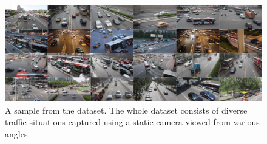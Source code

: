 \begin{figure}[t]
    \centerline{\includegraphics[width=\linewidth]{figures/datasets/uadetrac_samples.jpg}}
    \caption[\uadetrac{} dataset]{A sample from the \uadetrac{} dataset. The whole dataset consists of diverse traffic situations captured using a static camera viewed from various angles. }
    \label{fig:DatasetUADETRAC}
\end{figure}

\def\uadetracfigsize{0.4}

